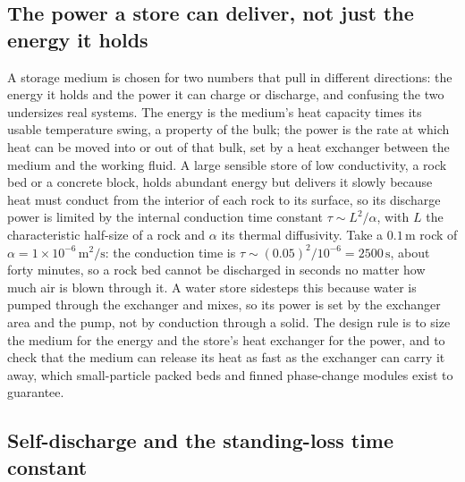 

\subsection{The power a store can deliver, not just the energy it holds}

A storage medium is chosen for two numbers that pull in different directions: the
energy it holds and the power it can charge or discharge, and confusing the two
undersizes real systems. The energy is the medium's heat capacity times its usable
temperature swing, a property of the bulk; the power is the rate at which heat can
be moved into or out of that bulk, set by a heat exchanger between the medium and
the working fluid. A large sensible store of low conductivity, a rock bed or a
concrete block, holds abundant energy but delivers it slowly because heat must
conduct from the interior of each rock to its surface, so its discharge power is
limited by the internal conduction time constant $\tau \sim L^2/\alpha$, with $L$
the characteristic half-size of a rock and $\alpha$ its thermal diffusivity. Take a
$0.1\,\text{m}$ rock of $\alpha = 1\times 10^{-6}\,\text{m}^2/\text{s}$: the
conduction time is $\tau \sim (0.05)^2/10^{-6} = 2500\,\text{s}$, about forty
minutes, so a rock bed cannot be discharged in seconds no matter how much air is
blown through it. A water store sidesteps this because water is pumped through the
exchanger and mixes, so its power is set by the exchanger area and the pump, not by
conduction through a solid. The design rule is to size the medium for the energy and
the store's heat exchanger for the power, and to check that the medium can release
its heat as fast as the exchanger can carry it away, which small-particle packed
beds and finned phase-change modules exist to guarantee.

\subsection{Self-discharge and the standing-loss time constant}

